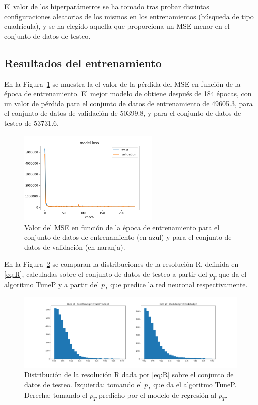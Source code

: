 El valor de los hiperpar\'ametros se ha tomado tras probar distintas configuraciones aleatorias de los mismos en los entrenamientos (b\'usqueda de tipo cuadr\'icula), y se ha elegido aquella que proporciona un MSE menor en el conjunto de datos de testeo.
  

\subsection{Resultados del entrenamiento}\label{sec:trainresults}

En la Figura~\ref{fig:model_loss} se muestra la el valor de la p\'erdida del MSE en funci\'on de la \'epoca de entrenamiento. El mejor modelo de obtiene despu\'es de 184 \'epocas, con un valor de p\'erdida para el conjunto de datos de entrenamiento de 49605.3, para el conjunto de datos de validaci\'on de 50399.8, y para el conjunto de datos de testeo de 53731.6.  \\

\begin{figure}[h]
\centering
\includegraphics[width=0.6\textwidth]{figures/model_loss.png}
\caption{Valor del MSE en funci\'on de la \'epoca de entrenamiento para el conjunto de datos de entrenamiento (en azul) y para el conjunto de datos de validaci\'on (en naranja).}
\label{fig:model_loss}        
\end{figure}


En la Figura~\ref{fig:R_predicted} se comparan la distribuciones de la resoluci\'on R, definida en \eqref{eq:R}, calculadas sobre el conjunto de datos de testeo a partir del $p_{T}$ que da el algoritmo TuneP y a partir del $p_{T}$ que predice la red neuronal respectivamente.

\begin{figure}[h]
\centering
\includegraphics[width=1.0\textwidth]{figures/R_predicted.png}
\caption{Distribuci\'on de la resoluci\'on R dada por \eqref{eq:R} sobre el conjunto de datos de testeo. Izquierda: tomando el $p_{T}$ que da el algoritmo TuneP. Derecha: tomando el $p_{T}$ predicho por el modelo de regresi\'on al $p_{T}$.}
\label{fig:R_predicted}        
\end{figure}

